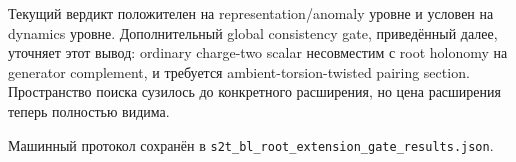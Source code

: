 Текущий вердикт положителен на representation/anomaly уровне и условен на
dynamics уровне. Дополнительный global consistency gate, приведённый далее,
уточняет этот вывод: ordinary charge-two scalar несовместим с root holonomy
на generator complement, и требуется ambient-torsion-twisted pairing
section. Пространство поиска сузилось до конкретного расширения, но цена
расширения теперь полностью видима.

Машинный протокол сохранён в
\texttt{s2t\_bl\_root\_extension\_gate\_results.json}.